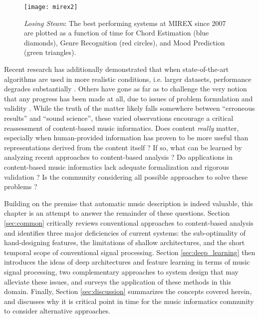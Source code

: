 \begin{figure}
\begin{centering}
\texttt{[image: mirex2]}
\caption{\emph{Losing Steam}: The best performing systems at MIREX since 2007 are plotted as a function of time for Chord Estimation (blue diamonds), Genre Recognition (red circles), and Mood Prediction (green triangles).}
\label{fig:mirex}
\end{centering}
\end{figure}

Recent research has additionally demonstrated that when state-of-the-art algorithms are used in more realistic conditions, i.e. larger datasets, performance degrades substantially \cite{BertinMahieux2012, Gouyon2013?}.
Others have gone as far as to challenge the very notion that any progress has been made at all, due to issues of problem formulation and validity \cite{Sturm2013}.
While the truth of the matter likely falls somewhere between ``erroneous results'' and ``sound science'', these varied observations encourage a critical reassessment of content-based music informatics.
Does content \emph{really} matter, especially when human-provided information has proven to be more useful than representations derived from the content itself \cite{Slaney2011}?
If so, what can be learned by analyzing recent approaches to content-based analysis \cite{Flexer2012}?
Do applications in content-based music informatics lack adequate formalization and rigorous validation \cite{Sturm2014}?
Is the community considering all possible approaches to solve these problems \cite{Humphrey2012a}?

Building on the premise that automatic music description is indeed valuable, this chapter is an attempt to answer the remainder of these questions.
Section \ref{sec:common} critically reviews conventional approaches to content-based analysis and identifies three major deficiencies of current systems: the sub-optimality of hand-designing features, the limitations of shallow architectures, and the short temporal scope of conventional signal processing.
Section \ref{sec:deep_learning} then introduces the ideas of deep architectures and feature learning in terms of music signal processing, two complementary approaches to system design that may alleviate these issues, and surveys the application of these methods in this domain.
Finally, Section \ref{sec:discussion} summarizes the concepts covered herein, and discusses why it is critical point in time for the music informatics community to consider alternative approaches.


